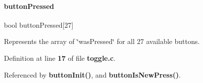 \paragraph{button\+Pressed}
{\footnotesize\ttfamily bool button\+Pressed[27]}



Represents the array of \char`\"{}was\+Pressed\char`\"{} for all 27 available buttons. 



Definition at line \textbf{ 17} of file \textbf{ toggle.\+c}.



Referenced by \textbf{ button\+Init()}, and \textbf{ button\+Is\+New\+Press()}.

